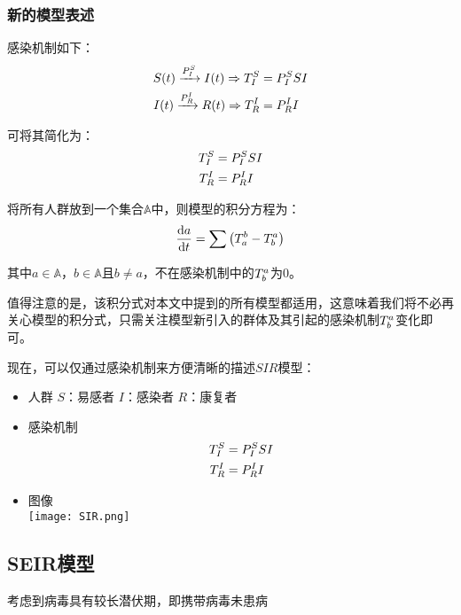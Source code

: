 \subsubsection{新的模型表述}
\par 感染机制如下：
\begin{align}
    S(t)\xrightarrow{P^{S}_{I}}I(t) \Rightarrow T^{S}_{I}&=P^{S}_{I}SI \\
    I(t)\xrightarrow{P^{I}_{R}}R(t) \Rightarrow T^{I}_{R}&=P^{I}_{R}I
\end{align}
\par 可将其简化为：
\begin{align}
    T^{S}_{I}&=P^{S}_{I}SI \\
    T^{I}_{R}&=P^{I}_{R}I
\end{align}
\par 将所有人群放到一个集合$\mathbb{A}$中，则模型的积分方程为：
\begin{equation}
    \frac{\mathrm{d}a}{\mathrm{d}t} = \sum\left(T^{b}_{a}-T^{a}_{b}\right)
\end{equation}
\par 其中$a\in\mathbb{A}$，$b\in\mathbb{A}$且$b\not=a$，不在感染机制中的$T^{a}_{b}$为$0$。
\par 值得注意的是，该积分式对本文中提到的所有模型都适用，这意味着我们将不必再关心模型的积分式，只需关注模型新引入的群体及其引起的感染机制$T^{a}_{b}$变化即可。
\par 现在，可以仅通过感染机制来方便清晰的描述$SIR$模型：
\begin{itemize}
    \item 人群
          \subitem $S$：易感者
          \subitem $I$：感染者
          \subitem $R$：康复者
    \item 感染机制
          \subitem
          \begin{align}
              T^{S}_{I}&=P^{S}_{I}SI \\
              T^{I}_{R}&=P^{I}_{R}I
          \end{align}
    \item 图像
          \\
          \texttt{[image: SIR.png]}
\end{itemize}
\subsection{SEIR模型}
考虑到病毒具有较长潜伏期，即携带病毒未患病
